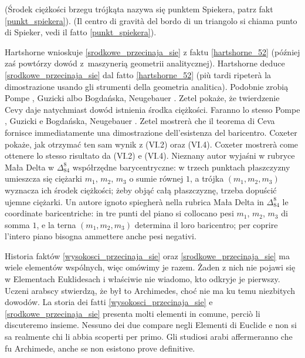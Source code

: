 (Środek ciężkości brzegu trójkąta nazywa się punktem Spiekera, patrz fakt \ref{punkt_spiekera}). %
(Il centro di gravità del bordo di un triangolo si chiama punto di Spieker, vedi il fatto \ref{punkt_spiekera}). %
%

Hartshorne \cite[s. 52-54]{hartshorne_2000} wnioskuje \ref{srodkowe_przecinaja_sie} z faktu \ref{hartshorne_52} (później zaś \cite[s. 119-120]{hartshorne_2000} powtórzy dowód z~maszynerią geometrii analitycznej). %
Hartshorne \cite[p. 52-54]{hartshorne_2000} deduce \ref{srodkowe_przecinaja_sie} dal fatto \ref{hartshorne_52} (più tardi \cite[p. 119-120]{hartshorne_2000} ripeterà la dimostrazione usando gli strumenti della geometria analitica). %
Podobnie zrobią Pompe \cite[s. 41]{pompe_2022}, Guzicki \cite[s. 220]{guzicki_2021} albo Bogdańska, Neugebauer \cite[s. 53]{guzicki_2021}. %
Zetel \cite[s. 14, 25]{zetel_2020} pokaże, że twierdzenie Cevy daje natychmiast dowód istnienia środka ciężkości. %
Faranno lo stesso Pompe \cite[p. 41]{pompe_2022}, Guzicki \cite[p. 220]{guzicki_2021} e Bogdańska, Neugebauer \cite[p. 53]{guzicki_2021}. %
Zetel \cite[p. 14, 25]{zetel_2020} mostrerà che il teorema di Ceva fornisce immediatamente una dimostrazione dell'esistenza del baricentro. %
Coxeter \cite[s. 26]{coxeter_1967} pokaże, jak otrzymać ten sam wynik z (VI.2) oraz (VI.4). %
Coxeter \cite[p. 26]{coxeter_1967} mostrerà come ottenere lo stesso risultato da (VI.2) e (VI.4). %
Nieznany autor wyjaśni w rubryce Mała Delta w $\Delta_{84}^{8}$ współrzędne barycentryczne: w trzech punktach płaszczyzny umieszcza się ciężarki $m_1$, $m_2$, $m_3$ o sumie równej $1$, a trójka $(m_1, m_2, m_3)$ wyznacza ich środek ciężkości; żeby objąć całą płaszczyznę, trzeba dopuścić ujemne ciężarki. %
Un autore ignoto spiegherà nella rubrica Mała Delta in $\Delta_{84}^{8}$ le coordinate baricentriche: in tre punti del piano si collocano pesi $m_1$, $m_2$, $m_3$ di somma $1$, e la terna $(m_1, m_2, m_3)$ determina il loro baricentro; per coprire l'intero piano bisogna ammettere anche pesi negativi. %

Historia faktów \ref{wysokosci_przecinaja_sie} oraz \ref{srodkowe_przecinaja_sie} ma wiele elementów wspólnych, więc omówimy je razem. %
Żaden z nich nie pojawi się w Elementach Euklidesach i właściwie nie wiadomo, kto odkryje je pierwszy. %
Uczeni arabscy stwierdzą, że był to Archimedes, choć nie ma ku temu niezbitych dowodów. %
La storia dei fatti \ref{wysokosci_przecinaja_sie} e \ref{srodkowe_przecinaja_sie} presenta molti elementi in comune, perciò li discuteremo insieme. %
Nessuno dei due compare negli Elementi di Euclide e non si sa realmente chi li abbia scoperti per primo. %
Gli studiosi arabi affermeranno che fu Archimede, anche se non esistono prove definitive. %

